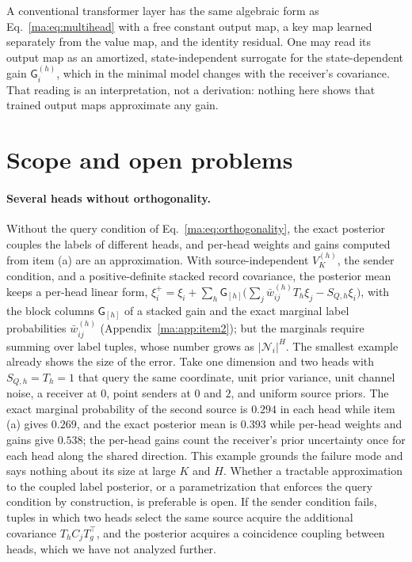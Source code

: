 \documentclass[11pt]{article}
\theoremstyle{definition}
\theoremstyle{remark}
\newcommand{\Nset}{\mathcal N}
\newcommand{\G}{\mathsf G}
\begin{document}
A conventional transformer layer has the same algebraic form as Eq.~\eqref{ma:eq:multihead} with a free constant output map, a key map learned separately from the value map, and the identity residual. One may read its output map as an amortized, state-independent surrogate for the state-dependent gain $\G^{(h)}_i$, which in the minimal model changes with the receiver's covariance. That reading is an interpretation, not a derivation: nothing here shows that trained output maps approximate any gain.

\section{Scope and open problems}
\label{ma:sec:open}

\paragraph{Several heads without orthogonality.}
Without the query condition of Eq.~\eqref{ma:eq:orthogonality}, the exact posterior couples the labels of different heads, and per-head weights and gains computed from item (a) are an approximation. With source-independent $V^{(h)}_K$, the sender condition, and a positive-definite stacked record covariance, the posterior mean keeps a per-head linear form, $\xi_i^+=\xi_i+\sum_h\G_{[h]}\bigl(\sum_j\bar w^{(h)}_{ij}T_h\xi_j-S_{Q,h}\xi_i\bigr)$, with the block columns $\G_{[h]}$ of a stacked gain and the exact marginal label probabilities $\bar w^{(h)}_{ij}$ (Appendix~\ref{ma:app:item2}); but the marginals require summing over label tuples, whose number grows as $|\Nset_i|^H$. The smallest example already shows the size of the error. Take one dimension and two heads with $S_{Q,h}=T_h=1$ that query the same coordinate, unit prior variance, unit channel noise, a receiver at $0$, point senders at $0$ and $2$, and uniform source priors. The exact marginal probability of the second source is $0.294$ in each head while item (a) gives $0.269$, and the exact posterior mean is $0.393$ while per-head weights and gains give $0.538$; the per-head gains count the receiver's prior uncertainty once for each head along the shared direction. This example grounds the failure mode and says nothing about its size at large $K$ and $H$. Whether a tractable approximation to the coupled label posterior, or a parametrization that enforces the query condition by construction, is preferable is open. If the sender condition fails, tuples in which two heads select the same source acquire the additional covariance $T_hC_jT_g^\top$, and the posterior acquires a coincidence coupling between heads, which we have not analyzed further.
\end{document}
